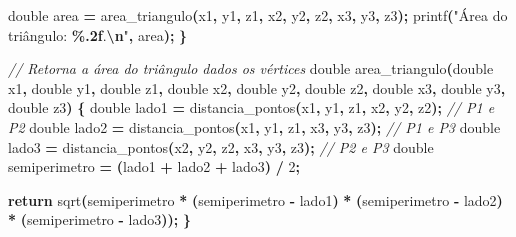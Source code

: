 \documentclass[
  11pt,
  a4paper,
]{scrbook}
\newenvironment{Shaded}{\begin{snugshade}}{\end{snugshade}}
\newcommand{\CommentTok}[1]{\textcolor[rgb]{0.56,0.35,0.01}{\textit{#1}}}
\newcommand{\ControlFlowTok}[1]{\textcolor[rgb]{0.13,0.29,0.53}{\textbf{#1}}}
\newcommand{\DataTypeTok}[1]{\textcolor[rgb]{0.13,0.29,0.53}{#1}}
\newcommand{\DecValTok}[1]{\textcolor[rgb]{0.00,0.00,0.81}{#1}}
\newcommand{\NormalTok}[1]{#1}
\newcommand{\OperatorTok}[1]{\textcolor[rgb]{0.81,0.36,0.00}{\textbf{#1}}}
\newcommand{\SpecialCharTok}[1]{\textcolor[rgb]{0.81,0.36,0.00}{\textbf{#1}}}
\newcommand{\StringTok}[1]{\textcolor[rgb]{0.31,0.60,0.02}{#1}}
\begin{document}
\begin{Shaded}
\begin{Highlighting}[]
    \DataTypeTok{double}\NormalTok{ area }\OperatorTok{=}\NormalTok{ area\_triangulo}\OperatorTok{(}\NormalTok{x1}\OperatorTok{,}\NormalTok{ y1}\OperatorTok{,}\NormalTok{ z1}\OperatorTok{,}\NormalTok{ x2}\OperatorTok{,}\NormalTok{ y2}\OperatorTok{,}\NormalTok{ z2}\OperatorTok{,}\NormalTok{ x3}\OperatorTok{,}\NormalTok{ y3}\OperatorTok{,}\NormalTok{ z3}\OperatorTok{);}
\NormalTok{    printf}\OperatorTok{(}\StringTok{"Área do triângulo: }\SpecialCharTok{\%.2f}\StringTok{.}\SpecialCharTok{\textbackslash{}n}\StringTok{"}\OperatorTok{,}\NormalTok{ area}\OperatorTok{);}
\OperatorTok{\}}

\CommentTok{// Retorna a área do triângulo dados os vértices}
\DataTypeTok{double}\NormalTok{ area\_triangulo}\OperatorTok{(}\DataTypeTok{double}\NormalTok{ x1}\OperatorTok{,} \DataTypeTok{double}\NormalTok{ y1}\OperatorTok{,} \DataTypeTok{double}\NormalTok{ z1}\OperatorTok{,}
                      \DataTypeTok{double}\NormalTok{ x2}\OperatorTok{,} \DataTypeTok{double}\NormalTok{ y2}\OperatorTok{,} \DataTypeTok{double}\NormalTok{ z2}\OperatorTok{,}
                      \DataTypeTok{double}\NormalTok{ x3}\OperatorTok{,} \DataTypeTok{double}\NormalTok{ y3}\OperatorTok{,} \DataTypeTok{double}\NormalTok{ z3}\OperatorTok{)} \OperatorTok{\{}
    \DataTypeTok{double}\NormalTok{ lado1 }\OperatorTok{=}\NormalTok{ distancia\_pontos}\OperatorTok{(}\NormalTok{x1}\OperatorTok{,}\NormalTok{ y1}\OperatorTok{,}\NormalTok{ z1}\OperatorTok{,}\NormalTok{ x2}\OperatorTok{,}\NormalTok{ y2}\OperatorTok{,}\NormalTok{ z2}\OperatorTok{);} \CommentTok{// P1 e P2}
    \DataTypeTok{double}\NormalTok{ lado2 }\OperatorTok{=}\NormalTok{ distancia\_pontos}\OperatorTok{(}\NormalTok{x1}\OperatorTok{,}\NormalTok{ y1}\OperatorTok{,}\NormalTok{ z1}\OperatorTok{,}\NormalTok{ x3}\OperatorTok{,}\NormalTok{ y3}\OperatorTok{,}\NormalTok{ z3}\OperatorTok{);} \CommentTok{// P1 e P3}
    \DataTypeTok{double}\NormalTok{ lado3 }\OperatorTok{=}\NormalTok{ distancia\_pontos}\OperatorTok{(}\NormalTok{x2}\OperatorTok{,}\NormalTok{ y2}\OperatorTok{,}\NormalTok{ z2}\OperatorTok{,}\NormalTok{ x3}\OperatorTok{,}\NormalTok{ y3}\OperatorTok{,}\NormalTok{ z3}\OperatorTok{);} \CommentTok{// P2 e P3}
    \DataTypeTok{double}\NormalTok{ semiperimetro }\OperatorTok{=} \OperatorTok{(}\NormalTok{lado1 }\OperatorTok{+}\NormalTok{ lado2 }\OperatorTok{+}\NormalTok{ lado3}\OperatorTok{)} \OperatorTok{/} \DecValTok{2}\OperatorTok{;}

    \ControlFlowTok{return}\NormalTok{ sqrt}\OperatorTok{(}\NormalTok{semiperimetro }\OperatorTok{*} \OperatorTok{(}\NormalTok{semiperimetro }\OperatorTok{{-}}\NormalTok{ lado1}\OperatorTok{)} \OperatorTok{*}
                \OperatorTok{(}\NormalTok{semiperimetro }\OperatorTok{{-}}\NormalTok{ lado2}\OperatorTok{)} \OperatorTok{*} \OperatorTok{(}\NormalTok{semiperimetro }\OperatorTok{{-}}\NormalTok{ lado3}\OperatorTok{));}
\OperatorTok{\}}


\end{Highlighting}
\end{Shaded}
\end{document}
